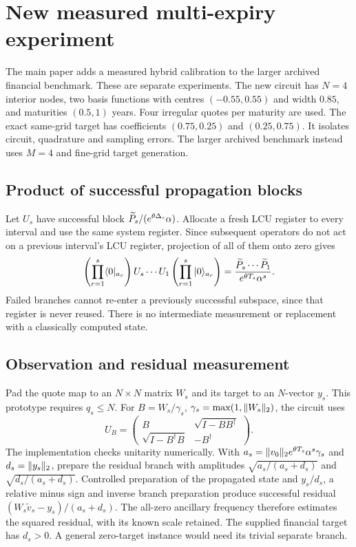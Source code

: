 \section{New measured multi-expiry experiment}
The main paper adds a measured hybrid calibration to the larger archived
financial benchmark. These are separate experiments. The new circuit has
$N=4$ interior nodes, two basis functions with centres $(-0.55,0.55)$ and
width $0.85$, and maturities $(0.5,1)$ years. Four irregular quotes per maturity
are used. The exact same-grid target has coefficients $(0.75,0.25)$ and
$(0.25,0.75)$. It isolates circuit, quadrature and sampling errors. The larger
archived benchmark instead uses $M=4$ and fine-grid target generation.

\subsection{Product of successful propagation blocks}
Let $U_s$ have successful block $\widetilde P_s/(e^{\theta\Delta_s}\alpha)$.
Allocate a fresh LCU register to every interval and use the same system register.
Since subsequent operators do not act on a previous interval's LCU register,
projection of all of them onto zero gives
\begin{equation}
 \left(\prod_{r=1}^s\langle0|_{a_r}\right)U_s\cdots U_1
 \left(\prod_{r=1}^s|0\rangle_{a_r}\right)
 =\frac{\widetilde P_s\cdots\widetilde P_1}{e^{\theta T_s}\alpha^s}.
\end{equation}
Failed branches cannot re-enter a previously successful subspace, since that
register is never reused. There is no intermediate measurement or replacement
with a classically computed state.

\subsection{Observation and residual measurement}
Pad the quote map to an $N\times N$ matrix $W_s$ and its target to an
$N$-vector $y_s$. This prototype requires $q_s\leq N$.
For $B=W_s/\gamma_s$, $\gamma_s=\max(1,\lVert W_s\rVert_2)$, the circuit uses
\begin{equation}
 U_B=\begin{pmatrix}B&\sqrt{I-BB^\dagger}\\
 \sqrt{I-B^\dagger B}&-B^\dagger\end{pmatrix}.
\end{equation}
The implementation checks unitarity numerically. With
$a_s=\lVert v_0\rVert_2e^{\theta T_s}\alpha^s\gamma_s$ and
$d_s=\lVert y_s\rVert_2$, prepare the residual branch with amplitudes
$\sqrt{a_s/(a_s+d_s)}$ and $\sqrt{d_s/(a_s+d_s)}$.
Controlled preparation of the propagated state and $y_s/d_s$, a relative
minus sign and inverse branch preparation produce successful residual
$(W_s\widetilde v_s-y_s)/(a_s+d_s)$.
The all-zero ancillary frequency therefore estimates the squared residual,
with its known scale retained. The supplied financial target has $d_s>0$.
A general zero-target instance would need its trivial separate branch.

